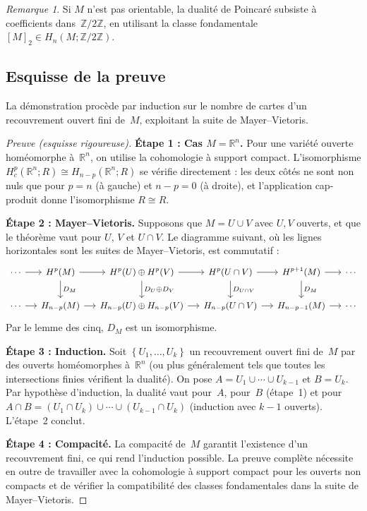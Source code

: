 \documentclass[12pt,a4paper,openany]{book}
\theoremstyle{definition}
\theoremstyle{plain}
\theoremstyle{remark}
\newtheorem{remarque}[definition]{Remarque}
\newcommand{\Z}{\mathbb{Z}}
\newcommand{\R}{\mathbb{R}}
\newcommand{\set}[1]{\left\{#1\right\}}
\begin{document}
\begin{remarque}\label{rem:dualite-non-orientable}
  Si $M$ n'est pas orientable, la dualité de Poincaré subsiste à coefficients
  dans~$\Z/2\Z$, en utilisant la classe fondamentale $[M]_2 \in H_n(M; \Z/2\Z)$.
\end{remarque}

\subsection{Esquisse de la preuve}\label{subsec:preuve-poincare}

La démonstration procède par induction sur le nombre de cartes d'un recouvrement
ouvert fini de~$M$, exploitant la suite de Mayer--Vietoris.

\begin{proof}[Preuve (esquisse rigoureuse)]
  \textbf{Étape 1 : Cas $M = \R^n$.}
  Pour une variété ouverte homéomorphe à~$\R^n$, on utilise la cohomologie à support
  compact. L'isomorphisme $H^p_c(\R^n; R) \cong H_{n-p}(\R^n; R)$ se vérifie
  directement : les deux côtés ne sont non nuls que pour $p = n$ (à gauche) et
  $n-p = 0$ (à droite), et l'application cap-produit donne l'isomorphisme
  $R \cong R$.

  \textbf{Étape 2 : Mayer--Vietoris.}
  Supposons que $M = U \cup V$ avec $U, V$ ouverts, et que le théorème vaut pour
  $U$, $V$ et $U \cap V$. Le diagramme suivant, où les lignes horizontales sont les
  suites de Mayer--Vietoris, est commutatif :
  \[
    \begin{tikzcd}[column sep=small, font=\small]
      \cdots \ar[r] & H^p(M) \ar[r] \ar[d, "D_M"] &
      H^p(U) \oplus H^p(V) \ar[r] \ar[d, "D_U \oplus D_V"] &
      H^p(U \cap V) \ar[r] \ar[d, "D_{U\cap V}"] &
      H^{p+1}(M) \ar[r] \ar[d, "D_M"] & \cdots \\
      \cdots \ar[r] & H_{n-p}(M) \ar[r] &
      H_{n-p}(U) \oplus H_{n-p}(V) \ar[r] &
      H_{n-p}(U \cap V) \ar[r] &
      H_{n-p-1}(M) \ar[r] & \cdots
    \end{tikzcd}
  \]
  Par le lemme des cinq, $D_M$ est un isomorphisme.

  \textbf{Étape 3 : Induction.}
  Soit $\set{U_1, \ldots, U_k}$ un recouvrement ouvert fini de~$M$ par des ouverts
  homéomorphes à~$\R^n$ (ou plus généralement tels que toutes les intersections
  finies vérifient la dualité). On pose $A = U_1 \cup \cdots \cup U_{k-1}$ et
  $B = U_k$. Par hypothèse d'induction, la dualité vaut pour~$A$, pour~$B$
  (étape~1) et pour $A \cap B = (U_1 \cap U_k) \cup \cdots \cup (U_{k-1} \cap U_k)$
  (induction avec $k-1$ ouverts). L'étape~2 conclut.

  \textbf{Étape 4 : Compacité.}
  La compacité de~$M$ garantit l'existence d'un recouvrement fini, ce qui rend
  l'induction possible. La preuve complète nécessite en outre de travailler avec la
  cohomologie à support compact pour les ouverts non compacts et de vérifier la
  compatibilité des classes fondamentales dans la suite de Mayer--Vietoris.
\end{proof}
\end{document}
